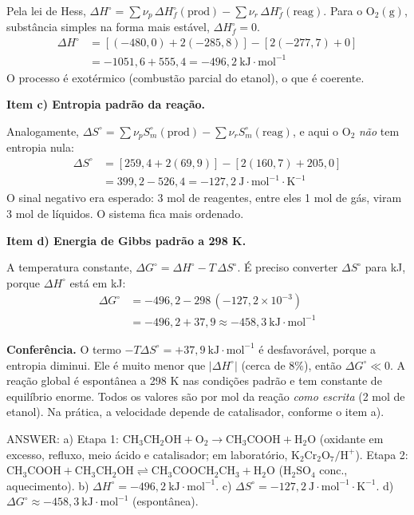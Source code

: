 \documentclass{article}%
\begin{document}
Pela lei de Hess, $\Delta H^\circ=\sum \nu_p\,\Delta H_f^\circ(\text{prod})-\sum \nu_r\,\Delta H_f^\circ(\text{reag})$. Para o $\mathrm{O_2(g)}$, substância simples na forma mais estável, $\Delta H_f^\circ=0$.
\begin{align*}
\Delta H^\circ &= \left[(-480{,}0)+2(-285{,}8)\right]-\left[2(-277{,}7)+0\right]\\
&= -1051{,}6+555{,}4 = -496{,}2\ \mathrm{kJ\cdot mol^{-1}}
\end{align*}
O processo é exotérmico (combustão parcial do etanol), o que é coerente.

\medskip
\textbf{Item c) Entropia padrão da reação.}

Analogamente, $\Delta S^\circ=\sum \nu_p S^\circ_m(\text{prod})-\sum \nu_r S^\circ_m(\text{reag})$, e aqui o $\mathrm{O_2}$ \emph{não} tem entropia nula:
\begin{align*}
\Delta S^\circ &= \left[259{,}4+2(69{,}9)\right]-\left[2(160{,}7)+205{,}0\right]\\
&= 399{,}2-526{,}4=-127{,}2\ \mathrm{J\cdot mol^{-1}\cdot K^{-1}}
\end{align*}
O sinal negativo era esperado: 3 mol de reagentes, entre eles 1 mol de gás, viram 3 mol de líquidos. O sistema fica mais ordenado.

\medskip
\textbf{Item d) Energia de Gibbs padrão a 298 K.}

A temperatura constante, $\Delta G^\circ=\Delta H^\circ-T\,\Delta S^\circ$. É preciso converter $\Delta S^\circ$ para kJ, porque $\Delta H^\circ$ está em kJ:
\begin{align*}
\Delta G^\circ &= -496{,}2-298\,(-127{,}2\times10^{-3})\\
&= -496{,}2+37{,}9 \approx -458{,}3\ \mathrm{kJ\cdot mol^{-1}}
\end{align*}

\textbf{Conferência.} O termo $-T\Delta S^\circ=+37{,}9\ \mathrm{kJ\cdot mol^{-1}}$ é desfavorável, porque a entropia diminui. Ele é muito menor que $|\Delta H^\circ|$ (cerca de $8\%$), então $\Delta G^\circ\ll 0$. A reação global é espontânea a 298 K nas condições padrão e tem constante de equilíbrio enorme. Todos os valores são por mol da reação \emph{como escrita} (2 mol de etanol). Na prática, a velocidade depende de catalisador, conforme o item a).

\medskip
ANSWER: a) Etapa 1: $\mathrm{CH_3CH_2OH + O_2 \rightarrow CH_3COOH + H_2O}$ (oxidante em excesso, refluxo, meio ácido e catalisador; em laboratório, $\mathrm{K_2Cr_2O_7/H^+}$). Etapa 2: $\mathrm{CH_3COOH + CH_3CH_2OH \rightleftharpoons CH_3COOCH_2CH_3 + H_2O}$ ($\mathrm{H_2SO_4}$ conc., aquecimento). b) $\Delta H^\circ=-496{,}2\ \mathrm{kJ\cdot mol^{-1}}$. c) $\Delta S^\circ=-127{,}2\ \mathrm{J\cdot mol^{-1}\cdot K^{-1}}$. d) $\Delta G^\circ\approx-458{,}3\ \mathrm{kJ\cdot mol^{-1}}$ (espontânea).
%
\newpage%
\end{document}
